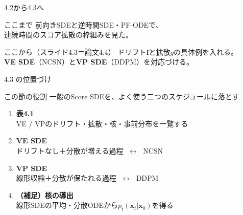 

\begin{frame}{4.2から4.3へ}
    \begin{block}{ここまで}
        前向きSDEと逆時間SDE・PF-ODEで、\\
        連続時間のスコア拡散の枠組みを見た。
    \end{block}
    \begin{block}{ここから（スライド4.3＝論文4.4）}
        ドリフト$\bm{f}$と拡散$g$の具体例を入れる。\\
        \textbf{VE SDE}（NCSN）と\textbf{VP SDE}（DDPM）を対応づける。
    \end{block}
\end{frame}
\asmain
\begin{frame}{4.3 の位置づけ}
    \begin{block}{この節の役割}
        一般のScore SDEを、よく使う二つのスケジュールに落とす
    \end{block}
    \begin{enumerate}
        \item \textbf{表4.1}\\
        VE / VPのドリフト・拡散・核・事前分布を一覧する
        \item \textbf{VE SDE}\\
        ドリフトなし＋分散が増える過程 $\;\leftrightarrow\;$ NCSN
        \item \textbf{VP SDE}\\
        線形収縮＋分散が保たれる過程 $\;\leftrightarrow\;$ DDPM
        \item \textbf{（補足）核の導出}\\
        線形SDEの平均・分散ODEから$p_t(\bm{x}_t|\bm{x}_0)$を得る
    \end{enumerate}
\end{frame}
